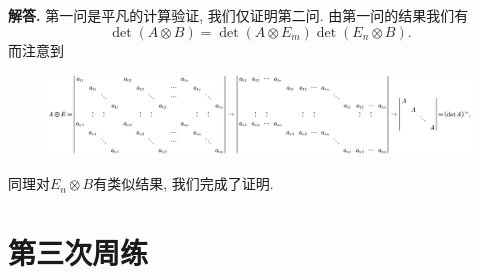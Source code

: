 \documentclass{article}
\newenvironment{solution}{\par\noindent\textbf{解答. }}{\par}
\begin{document}
\begin{solution}
第一问是平凡的计算验证, 我们仅证明第二问. 由第一问的结果我们有
$$
\det \left( A\otimes B \right) =\det \left( A\otimes E_m \right) \det \left( E_n\otimes B \right) .
$$
而注意到
\begin{figure}[htbp]
    \center
    \includegraphics[scale=0.46]{2.png}
\end{figure}

同理对$E_n\otimes B$有类似结果, 我们完成了证明.
\end{solution}
\newpage
\section{第三次周练}
\end{document}
